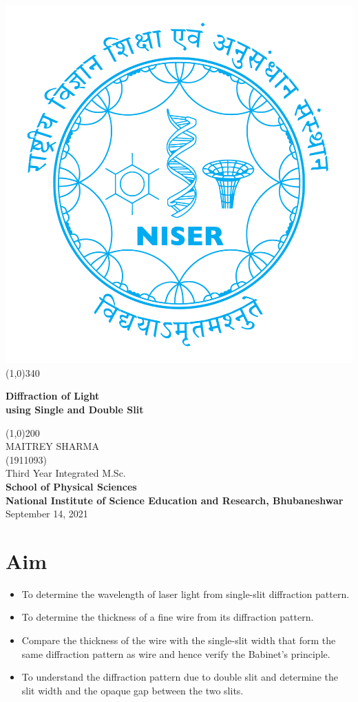 \documentclass{article}
\begin{document}
\begin{titlepage}
\begin{center}
\includegraphics[scale=0.12]{document/niser.png}
\line(1,0){340}\\
[1mm]
\begin{large}
\textbf{\huge Diffraction of Light \\ \normalsize using Single and Double Slit}\\ 
\end{large}
\line(1,0){200}\\
[5cm]
\large MAITREY SHARMA\\
\small (1911093)\\
[3.5cm]
Third Year Integrated M.Sc.\\
\textbf{School of Physical Sciences}\\
\textbf{National Institute of Science Education and Research, Bhubaneshwar}\\
\small September 14, 2021
\end{center} 
\end{titlepage}
\newpage
\section{Aim}
\begin{itemize}
    \item To determine the wavelength of laser light from single-slit diffraction pattern.
    \item To determine the thickness of a fine wire from its diffraction pattern. 
    \item Compare the thickness of the wire with the single-slit width that form the same diffraction pattern as wire and hence verify the Babinet’s principle.
    \item To understand the diffraction pattern due to double slit and determine the slit width and the opaque gap between the two slits.
\end{itemize}
\end{document}

